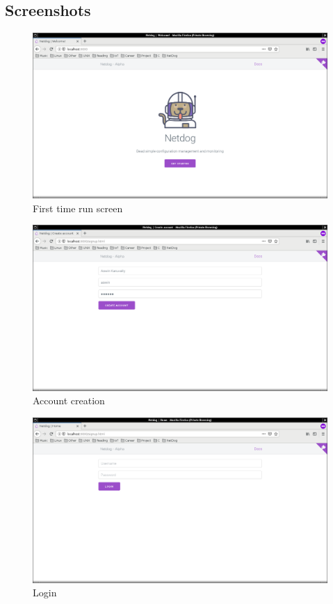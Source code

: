 \subsection{Screenshots}

\begin{figure}[H]
\includegraphics[scale=0.3]{first_time}
\caption{First time run screen}
\end{figure}

\begin{figure}[H]
\includegraphics[scale=0.3]{account_create}
\caption{Account creation}
\end{figure}

\begin{figure}[H]
\includegraphics[scale=0.3]{login}
\caption{Login}
\end{figure}

